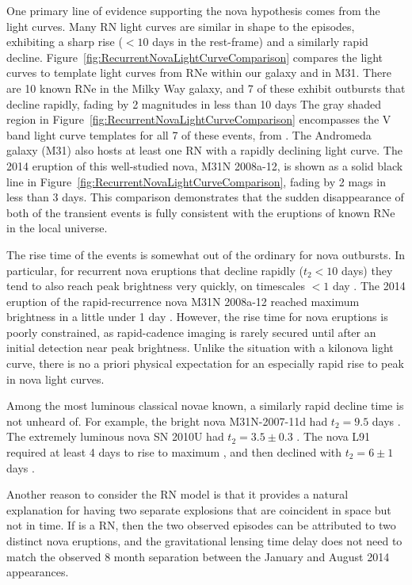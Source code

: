 One primary line of evidence supporting the nova hypothesis
comes from the \spock light curves. Many RN light curves are similar
in shape to the \spock episodes, exhibiting a sharp rise ($<10$ days
in the rest-frame) and a similarly rapid decline.
Figure~\ref{fig:RecurrentNovaLightCurveComparison} compares the \spock
light curves to template light curves from RNe within our galaxy and
in M31.  There are 10 known RNe in the Milky Way galaxy, and 7 of
these exhibit outbursts that decline rapidly, fading by 2 magnitudes
in less than 10 days \citep{Schaefer:2010}
The gray shaded region in
Figure~\ref{fig:RecurrentNovaLightCurveComparison} encompasses the V
band light curve templates for all 7 of these events, from
\citet{Schaefer:2010}.  The Andromeda galaxy (M31) also hosts at least
one RN with a rapidly declining light curve.  The 2014 eruption of
this well-studied nova, M31N 2008a-12, is shown as a solid black line
in Figure~\ref{fig:RecurrentNovaLightCurveComparison}, fading by 2
mags in less than 3 days.  This comparison demonstrates that the
sudden disappearance of both of the \spock transient events is fully
consistent with the eruptions of known RNe in the local universe.

The rise time of the \spock events is somewhat out of the ordinary for
nova outbursts.  In particular, for recurrent nova eruptions that
decline rapidly ($t_2<10$ days) they tend to also reach peak
brightness very quickly, on timescales $<1$ day
\citep{Schaefer:2010}. The 2014 eruption of the rapid-recurrence nova
M31N 2008a-12 reached maximum brightness in a little under 1 day
\citep{Darnley:2015}.  However, the rise time for nova eruptions is
poorly constrained, as rapid-cadence imaging is rarely secured until
after an initial detection near peak brightness.  Unlike the situation
with a kilonova light curve, there is no a priori physical expectation
for an especially rapid rise to peak in nova light curves.

Among the most luminous classical novae known, a similarly rapid
decline time is not unheard of.  For example, the bright nova
M31N-2007-11d had $t_2 = 9.5$ days \citep{Shafter:2009}.  The
extremely luminous nova SN 2010U had $t_2 = 3.5 \pm 0.3$
\citep{Czekala:2013}.  The nova L91 required at least 4 days to rise
to maximum \citep{Shafter:2009}, and then declined with $t_2 = 6 \pm
1$ days \citep{DellaValle:1991, Williams:1994, Schwarz:2001}.

Another reason to consider the RN model is that it provides a
natural explanation for having two separate explosions that are
coincident in space but not in time.  If \spock is a RN, then the two
observed episodes can be attributed to two distinct nova eruptions,
and the gravitational lensing time delay does not need to match the
observed 8 month separation between the January and August 2014
appearances.

